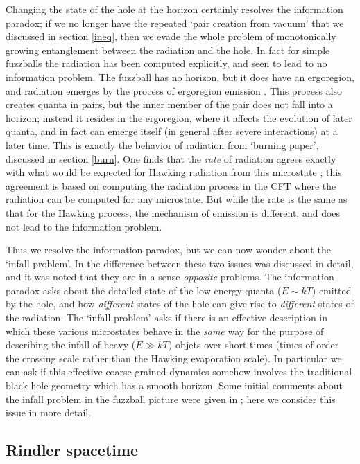 \documentclass[11pt]{article}
\begin{document}
Changing the state of the hole at the horizon certainly resolves the information paradox; if we no longer have the repeated `pair creation from vacuum' that we discussed in section  \ref{ineq}, then we evade the whole problem of monotonically growing entanglement between the radiation and the hole. In fact for simple fuzzballs the radiation has been computed explicitly, and seen to lead to no information problem. The fuzzball has no horizon, but it does have an ergoregion, and radiation emerges by the process of ergoregion emission \cite{ross,myers}. This process also creates quanta in pairs, but the inner member of the pair does not fall into a horizon; instead it resides in the ergoregion, where it affects the evolution of later quanta, and in fact can emerge itself (in general after severe interactions) at a later time. This is exactly the behavior of radiation from `burning paper', discussed in section  \ref{burn}. One finds that the {\it rate} of radiation agrees exactly with what would be expected for Hawking radiation from this microstate\cite{cm1} ; this agreement is based on computing the radiation process in the CFT where the radiation can be computed for any microstate. But while the rate is the same as that for the Hawking process, the mechanism of emission is different, and does not lead to the information problem.

Thus we resolve the information paradox, but we can now wonder about the `infall problem'. In \cite{mathurrecent} the difference between these two issues was discussed in detail, and it was noted that they are in a sense {\it opposite} problems. The information paradox asks about the detailed state of the low energy quanta ($E\sim kT$) emitted by the hole, and how {\it different} states of the hole can  give rise to {\it different} states of the radiation. The `infall problem' asks if there is an effective description in which these various microstates behave in the {\it same} way for the purpose of describing  the infall of heavy ($E\gg kT$) objets over short times (times of order the crossing scale rather than the Hawking evaporation scale).  In particular we can ask if this effective coarse grained dynamics somehow involves the traditional black hole geometry which has a smooth horizon. Some initial comments about the infall problem in the fuzzball picture were given in \cite{mathurrecent}; here we consider this issue in more detail. 

\subsection{Rindler spacetime}
\end{document}
